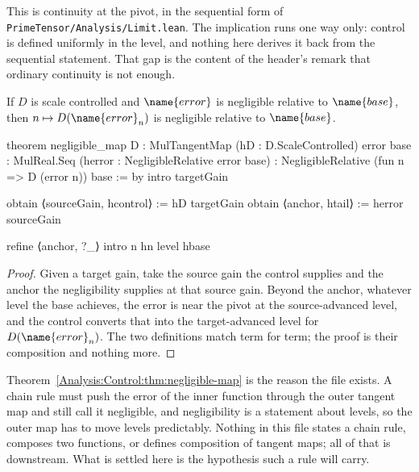 This is continuity at the pivot, in the sequential form of
\texttt{PrimeTensor/Analysis/Limit.lean}.  The implication runs one way only:
control is defined uniformly in the level, and nothing here derives it back
from the sequential statement.  That gap is the content of the header's remark
that ordinary continuity is not enough.

\begin{theorem}\label{Analysis:Control:thm:negligible-map}
If $D$ is scale controlled and $\name{error}$ is negligible relative to
$\name{base}$, then $n \mapsto D(\name{error}_n)$ is negligible relative to
$\name{base}$.
\end{theorem}

\begin{leancode}
theorem negligible_map
    {D : MulTangentMap}
    (hD : D.ScaleControlled)
    {error base : MulReal.Seq}
    (herror : NegligibleRelative error base) :
    NegligibleRelative (fun n => D (error n)) base := by
  intro targetGain

  obtain ⟨sourceGain, hcontrol⟩ := hD targetGain
  obtain ⟨anchor, htail⟩ := herror sourceGain

  refine ⟨anchor, ?_⟩
  intro n hn level hbase
\end{leancode}

\begin{proof}
Given a target gain, take the source gain the control supplies and the anchor
the negligibility supplies at that source gain.  Beyond the anchor, whatever
level the base achieves, the error is near the pivot at the source-advanced
level, and the control converts that into the target-advanced level for
$D(\name{error}_n)$.  The two definitions match term for term; the proof is
their composition and nothing more.
\end{proof}

\begin{remark}
\label{Analysis:Control:rem:purpose}
Theorem~\ref{Analysis:Control:thm:negligible-map} is the reason the file
exists.  A chain rule must push the error of the inner function through the
outer tangent map and still call it negligible, and negligibility is a
statement about levels, so the outer map has to move levels predictably.
Nothing in this file states a chain rule, composes two functions, or defines
composition of tangent maps; all of that is downstream.  What is settled here
is the hypothesis such a rule will carry.
\end{remark}

